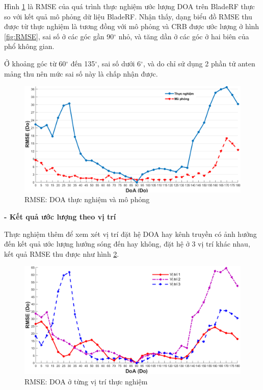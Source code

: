 Hình \ref{fig:kq1} là RMSE của quá trình thực nghiệm ước lượng DOA trên BladeRF thực so với kết quả mô phỏng dữ liệu BladeRF. Nhận thấy, dạng biểu đồ RMSE thu được từ thực nghiệm là tương đồng với mô phỏng và CRB được ước lượng ở hình \ref{fig:RMSE}, sai số ở các góc gần 90$^{\circ}$ nhỏ, và tăng dần ở các góc ở hai biên của phổ không gian.

Ở khoảng góc từ 60$^{\circ}$ đến 135$^{\circ}$, sai số dưới 6$^{\circ}$, và do chỉ sử dụng 2 phần tử anten mảng thu nên mức sai số này là chấp nhận được.
\begin{figure} [!h]
	\centering
	\includegraphics[width=1\linewidth]{figures/kq1.png}
	\caption{RMSE: DOA thực nghiệm và mô phỏng}
	\label{fig:kq1}
\end{figure}

\textbf{- Kết quả ước lượng theo vị trí}

Thực nghiệm thêm để xem xét vị trí đặt hệ DOA hay kênh truyền có ảnh hưởng đến kết quả ước lượng hướng sóng đến hay không, đặt hệ ở 3 vị trí khác nhau, kết quả RMSE thu được như hình \ref{fig:dvbt_1}.
\begin{figure} [!h]
	\centering
	\includegraphics[width=1\linewidth]{figures/dvbt_1.png}
	\caption{RMSE: DOA ở từng vị trí thực nghiệm}
	\label{fig:dvbt_1}
\end{figure}

